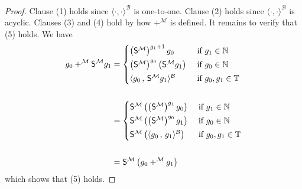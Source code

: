 \documentclass[10pt,a4paper, openany,  oldfontcommands]{memoir}
\newtheorem{open problem} [theorem] {Open Problem}
\newtheorem{open question} [theorem] {Open Question}
\renewcommand{\mathrm}{\mathsf}
\begin{document}
\begin{proof}
Clause (1) holds since $  \langle \cdot  , \cdot  \rangle^{   \mathcal{B}  }  $  is one-to-one. 
Clause (2) holds since  $  \langle \cdot  , \cdot  \rangle^{   \mathcal{B}  }  $ is acyclic. 
Clauses (3) and (4) hold by how  $  +^{  \mathcal{M}  }   $ is defined. 
It remains to verify that (5) holds. 
We have 
\begin{align*}
g_0   +^{  \mathcal{M} }    \mathrm{S}^{  \mathcal{M}  }  g_1 
&=   
\begin{cases}
\left(    \mathrm{S}^{  \mathcal{M}  }  \right)^{ g_1 +1  }   g_0         &    \mbox{ if  }  g_1  \in  \mathbb{N}
\vspace*{0.08cm}
\\
\left(    \mathrm{S}^{  \mathcal{M}  }  \right)^{ g_0   }    \left(    \mathrm{S}^{  \mathcal{M}  }   g_1    \right) 
                             &    \mbox{ if  }  g_0  \in  \mathbb{N}   
\vspace*{0.08cm}
 \\
\langle  g_0   \,  ,   \,    \mathrm{S}^{  \mathcal{M} } g_1     \rangle^{  \mathcal{B}    }       &    \mbox{ if  }     g_0,  g_1  \in  \mathbb{T} 
\end{cases}
\\
\\
&=   
\begin{cases}
 \mathrm{S}^{  \mathcal{M}  }   \left(  \left(    \mathrm{S}^{  \mathcal{M}  }  \right)^{ g_1  }   g_0     \right)       &    \mbox{ if  }  g_1  \in  \mathbb{N}
\vspace*{0.08cm}
\\
 \mathrm{S}^{  \mathcal{M}  }   \left(  \left(    \mathrm{S}^{  \mathcal{M}  }  \right)^{ g_0  }   g_1     \right)        
              &    \mbox{ if  }  g_0  \in  \mathbb{N}  
\vspace*{0.08cm}
 \\
 \mathrm{S}^{  \mathcal{M} }  \left(  \langle  g_0   \,  ,   \,    g_1     \rangle^{  \mathcal{B}   }   \right)      &    \mbox{ if  }     g_0,  g_1  \in  \mathbb{T} 
\end{cases}
\\
\\
&=   
 \mathrm{S}^{  \mathcal{M} }  \left(     g_0   +^{  \mathcal{M} }    g_1   \right) 
\end{align*}
which shows that  (5) holds. 
\end{proof}
\end{document}
